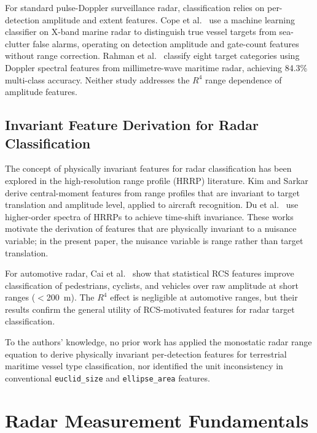 \documentclass[journal]{IEEEtran}
\begin{document}
For standard pulse-Doppler surveillance radar, classification relies on per-detection amplitude and extent features. Cope et al.~\cite{cope2021tracking} use a machine learning classifier on X-band marine radar to distinguish true vessel targets from sea-clutter false alarms, operating on detection amplitude and gate-count features without range correction. Rahman et al.~\cite{rahman2023mmwave} classify eight target categories using Doppler spectral features from millimetre-wave maritime radar, achieving 84.3\% multi-class accuracy. Neither study addresses the $R^4$ range dependence of amplitude features.

\subsection{Invariant Feature Derivation for Radar Classification}

The concept of physically invariant features for radar classification has been explored in the high-resolution range profile (HRRP) literature. Kim and Sarkar~\cite{kim2002music} derive central-moment features from range profiles that are invariant to target translation and amplitude level, applied to aircraft recognition. Du et al.~\cite{du2005hrrp} use higher-order spectra of HRRPs to achieve time-shift invariance. These works motivate the derivation of features that are physically invariant to a nuisance variable; in the present paper, the nuisance variable is range rather than target translation.

For automotive radar, Cai et al.~\cite{cai2021mmwave} show that statistical RCS features improve classification of pedestrians, cyclists, and vehicles over raw amplitude at short ranges ($<$200~m). The $R^4$ effect is negligible at automotive ranges, but their results confirm the general utility of RCS-motivated features for radar target classification.

To the authors' knowledge, no prior work has applied the monostatic radar range equation to derive physically invariant per-detection features for terrestrial maritime vessel type classification, nor identified the unit inconsistency in conventional \texttt{euclid\_size} and \texttt{ellipse\_area} features.

\section{Radar Measurement Fundamentals}
\end{document}
